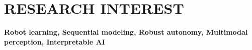 \documentclass[a4paper,10pt]{extarticle}
\begin{document}

\section*{RESEARCH INTEREST}
\textbf{Robot learning, Sequential modeling, Robust autonomy, Multimodal perception, Interpretable AI}


\end{document}
